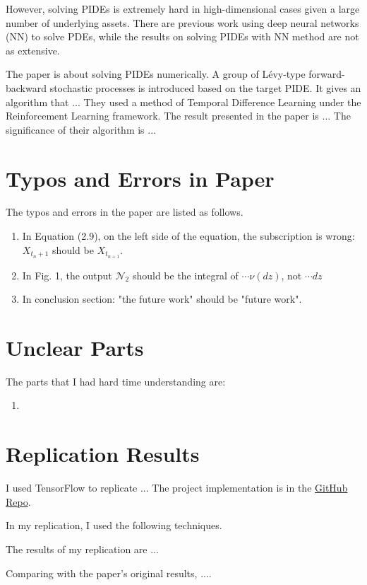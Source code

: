 \documentclass[12pt,letterpaper,oneside]{article}
\begin{document}
	However, solving PIDEs is extremely hard in high-dimensional cases given a large number of underlying assets. There are previous work using deep neural networks (NN) to solve PDEs, while the results on solving PIDEs with NN method are not as extensive.
	
	The paper is about solving PIDEs numerically. A group of L\'evy-type forward-backward stochastic processes is introduced based on the target PIDE. It gives an algorithm that ... They used a method of Temporal Difference Learning under the Reinforcement Learning framework.  The result presented in the paper is ... The significance of their algorithm is ...

	
\section{Typos and Errors in Paper}
	The typos and errors in the paper are listed as follows.
	\begin{enumerate}
		\item In Equation (2.9), on the left side of the equation, the subscription is wrong: $ X_{t_{n}+1} $ should be $ X_{t_{n+1}} $.
		\item In Fig. 1, the output $ \mathcal{N}_2 $ should be the integral of $ \cdots\nu(dz) $, not $ \cdots dz $
		\item In conclusion section: "the future work" should be "future work".
	\end{enumerate}


\section{Unclear Parts}
	The parts that I had hard time understanding are:
	
	\begin{enumerate}
		\item 
	\end{enumerate}

\section{Replication Results}
	I used TensorFlow to replicate ... The project implementation is in the \href{https://github.com/GN-Yu/TSRL-project}{GitHub Repo}.
	
	In my replication, I used the following techniques.
	
	The results of my replication are ... 
	
	Comparing with the paper's original results, ....
	
\end{document}

